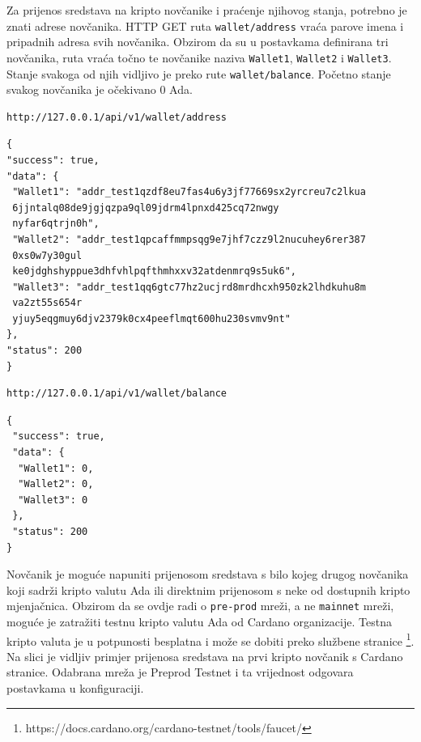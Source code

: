 \documentclass[times, utf8, diplomski]{fer}
\begin{document}
Za prijenos sredstava na kripto novčanike i praćenje njihovog stanja, potrebno je znati adrese novčanika. HTTP GET ruta \texttt{wallet/address} vraća parove imena i pripadnih adresa svih novčanika. Obzirom da su u postavkama definirana tri novčanika, ruta vraća točno te novčanike naziva \texttt{Wallet1}, \texttt{Wallet2} i \texttt{Wallet3}. Stanje svakoga od njih vidljivo je preko rute \texttt{wallet/balance}. Početno stanje svakog novčanika je očekivano 0 Ada.

\begin{verbatim}
http://127.0.0.1/api/v1/wallet/address
\end{verbatim}

\begin{lstlisting}
{
"success": true,
"data": {
 "Wallet1": "addr_test1qzdf8eu7fas4u6y3jf77669sx2yrcreu7c2lkua
 6jjntalq08de9jgjqzpa9ql09jdrm4lpnxd425cq72nwgy
 nyfar6qtrjn0h",
 "Wallet2": "addr_test1qpcaffmmpsqg9e7jhf7czz9l2nucuhey6rer387
 0xs0w7y30gul
 ke0jdghshyppue3dhfvhlpqfthmhxxv32atdenmrq9s5uk6",
 "Wallet3": "addr_test1qq6gtc77hz2ucjrd8mrdhcxh950zk2lhdkuhu8m
 va2zt55s654r
 yjuy5eqgmuy6djv2379k0cx4peeflmqt600hu230svmv9nt"
},
"status": 200
}
\end{lstlisting}

\begin{verbatim}
http://127.0.0.1/api/v1/wallet/balance
\end{verbatim}

\begin{lstlisting}
{
 "success": true,
 "data": {
  "Wallet1": 0,
  "Wallet2": 0,
  "Wallet3": 0
 },
 "status": 200
}
\end{lstlisting}

Novčanik je moguće napuniti prijenosom sredstava s bilo kojeg drugog novčanika koji sadrži kripto valutu Ada ili direktnim prijenosom s neke od dostupnih kripto mjenjačnica. Obzirom da se ovdje radi o \texttt{pre-prod} mreži, a ne \texttt{mainnet} mreži, moguće je zatražiti testnu kripto valutu Ada od Cardano organizacije. Testna kripto valuta je u potpunosti besplatna i može se dobiti preko službene stranice \footnote{https://docs.cardano.org/cardano-testnet/tools/faucet/}. Na slici je vidljiv primjer prijenosa sredstava na prvi kripto novčanik s Cardano stranice. Odabrana mreža je Preprod Testnet i ta vrijednost odgovara postavkama u konfiguraciji.
\end{document}
